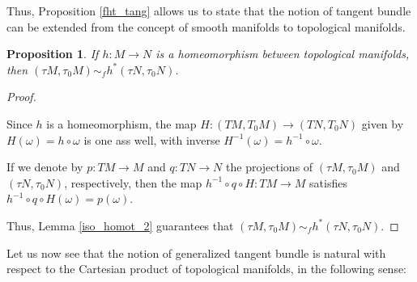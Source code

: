 \documentclass[12pt,oneside]{book}
\newtheorem{prop}   {Proposition}[chapter]
\begin{document}
    Thus, Proposition \ref{fht_tang} allows us to state that the notion of tangent bundle can be extended from the concept of smooth 
    manifolds to topological manifolds.

    \begin{prop}\label{iso_homeo}
    If $h:M\to N$ is a homeomorphism between topological manifolds, then $(\tau M,\tau_{0}M)\sim_{f}h^{*}(\tau N,\tau_{0}N)$.
    \end{prop}

    \begin{proof}
        
    \

    Since $h$ is a homeomorphism, the map $H:(TM,T_{0}M)\to (TN,T_{0}N)$ given by $H(\omega)=h\circ\omega$ is one ass well, with inverse 
    $H^{-1}(\omega)=h^{-1}\circ\omega$.

    If we denote by $p:TM\to M$ and $q:TN\to N$ the projections of $(\tau M,\tau_{0}M)$ and $(\tau N,\tau_{0}N)$, respectively, then the 
    map $h^{-1}\circ q\circ H:TM\to M$ satisfies $h^{-1}\circ q\circ H(\omega)=p(\omega)$.

    Thus, Lemma \ref{iso_homot_2} guarantees that $(\tau M,\tau_{0}M)\sim_{f}h^{*}(\tau N,\tau_{0}N)$.

    \end{proof}

    Let us now see that the notion of generalized tangent bundle is natural with respect to the Cartesian product of topological manifolds, 
    in the following sense:
\end{document}
